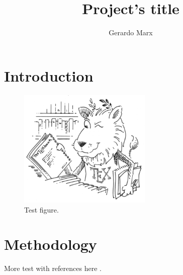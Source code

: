 \documentclass{article}
\title{Project's title}
\author{Gerardo Marx}
\begin{document}
\maketitle{}

\section{Introduction}
\label{sec:intro}
\lipsum[1]

\begin{figure}[htb]
  \centering
  \includegraphics[width=2.5in]{XdWGT}
  \caption{Test figure.}
  \label{test}
\end{figure}

\section{Methodology}
\label{sec:methods}

\lipsum[2-3]

More test with references here \cite{einstein}.


\end{document}
